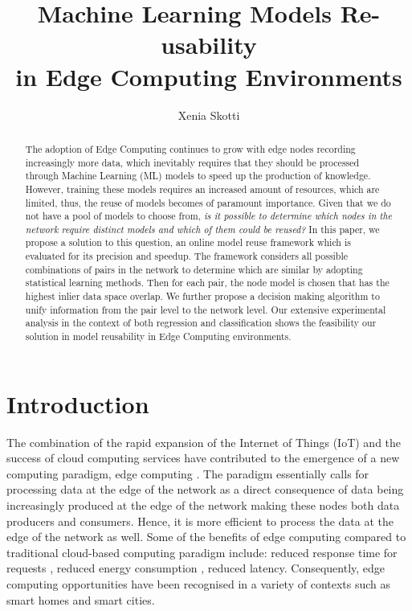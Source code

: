 \documentclass{mpaper}
\begin{document}
\title{Machine Learning Models Re-usability \\ in Edge Computing Environments}
\author{Xenia Skotti}

\maketitle


\begin{abstract}

The adoption of Edge Computing continues to grow with edge nodes recording increasingly more data, which inevitably requires that they should be processed through Machine Learning (ML) models to speed up the production of knowledge. However, training these models requires an increased amount of resources, which are limited, thus, the reuse of models becomes of paramount importance. Given that we do not have a pool of models to choose from, \textit{is it possible to determine which nodes in the network require distinct models and which of them could be reused?} In this paper, we propose a solution to this question, an online model reuse framework which is evaluated for its precision and speedup. The framework considers all possible combinations of pairs in the network to determine which are similar by adopting statistical learning methods. Then for each pair, the node model is chosen that has the highest inlier data space overlap. We further propose a decision making algorithm to unify information from the pair level to the network level. Our extensive experimental analysis in the context of both regression and classification shows the feasibility our solution in model reusability in Edge Computing environments. 

\end{abstract}

\section{Introduction}

The combination of the rapid expansion of the Internet of Things (IoT) and the success of cloud computing services have contributed to the emergence of a new computing paradigm, edge computing \cite{EdgeComputing}. The paradigm essentially calls for processing data at the edge of the network as a direct consequence of data being increasingly produced at the edge of the network making these nodes both data producers and consumers. Hence, it is more efficient to process the data at the edge of the network as well. Some of the benefits of edge computing compared to traditional cloud-based computing paradigm include: reduced response time for requests \cite{ECBreduced_response_time_wearables, ECBreduced_response_time}, reduced energy consumption \cite{ECBenergy}, reduced latency. Consequently, edge computing opportunities have been recognised in a variety of contexts such as smart homes and smart cities.  
\end{document}
